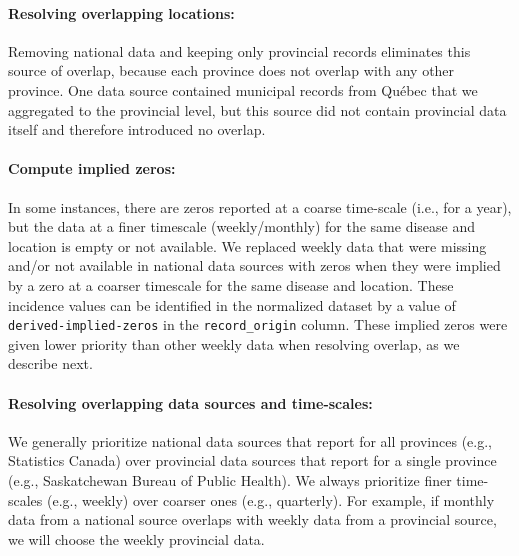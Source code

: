 \documentclass[12pt]{article}
\begin{document}
\paragraph{Resolving overlapping locations:} Removing national data and keeping only provincial records eliminates this source of overlap, because each province does not overlap with any other province. One data source contained municipal records from Québec that we aggregated to the provincial level, but this source did not contain provincial data itself and therefore introduced no overlap.

\paragraph{Compute implied zeros:} In some instances, there are zeros reported at a coarse time-scale (i.e., for a year), but the data at a finer timescale (weekly/monthly) for the same disease and location is empty or not available. We replaced weekly data that were missing and/or not available in national data sources with zeros when they were implied by a zero at a coarser timescale for the same disease and location. These incidence values can be identified in the normalized dataset by a value of \texttt{derived-implied-zeros} in the \texttt{record\_origin} column. These implied zeros were given lower priority than other weekly data when resolving overlap, as we describe next.

\paragraph{Resolving overlapping data sources and time-scales:} We generally prioritize national data sources that report for all provinces (e.g., Statistics Canada) over provincial data sources that report for a single province (e.g., Saskatchewan Bureau of Public Health). We always prioritize finer time-scales (e.g., weekly) over coarser ones (e.g., quarterly). For example, if monthly data from a national source overlaps with weekly data from a provincial source, we will choose the weekly provincial data.
\end{document}
